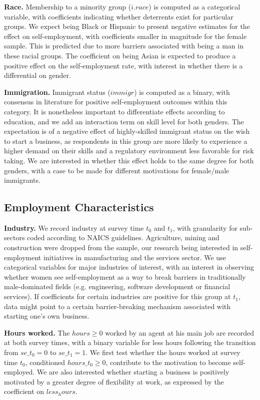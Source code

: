 \textbf{Race.} Membership to a minority group ($i.race$) is computed as a categorical variable, with coefficients indicating whether deterrents exist for particular groups. We expect being Black or Hispanic to present negative estimates for the effect on self-employment, with coefficients smaller in magnitude for the female sample. This is predicted due to more barriers associated with being a man in these racial groups. The coefficient on being Asian is expected to produce a positive effect on the self-employment rate, with interest in whether there is a differential on gender. 


\textbf{Immigration.} Immigrant status ($immigr$) is computed as a binary, with consensus in literature for positive self-employment outcomes within this category. It is nonetheless important to differentiate effects according to education, and we add an interaction term on skill level for both genders. The expectation is of a negative effect of highly-skilled immigrant status on the wish to start a business, as respondents in this group are more likely to experience a higher demand on their skills and a regulatory environment less favorable for risk taking. We are interested in whether this effect holds to the same degree for both genders, with a case to be made for different motivations for female/male immigrants. 


\subsection{Employment Characteristics}

\textbf{Industry.} We record industry at survey time $t_0$ and $t_1$, with granularity for sub-sectors coded according to NAICS guidelines. Agriculture, mining and construction were dropped from the sample, our research being interested in self-employment initiatives in manufacturing and the services sector. We use categorical variables for major industries of interest, with an interest in observing whether women see self-employment as a way to break barriers in traditionally male-dominated fields (e.g. engineering, software development or financial services). If coefficients for certain industries are positive for this group at $t_1$, data might point to a certain barrier-breaking mechanism associated with starting one's own business. 

\textbf{Hours worked.} The $hours \geq 0$ worked by an agent at his main job are recorded at both survey times, with a binary variable for less hours following the transition from $se\_t_0 = 0$ to $se\_t_1 = 1$. We first test whether the hours worked at survey time $t_0$, conditioned $hours\_t_0 \geq 0$, contribute to the motivation to become self-employed. We are also interested whether starting a business is positively motivated by a greater degree of flexibility at work, as expressed by the coefficient on $less_hours$. 

